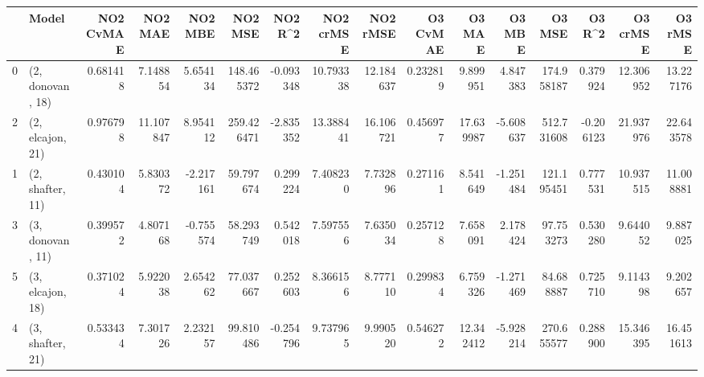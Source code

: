 \begin{tabular}{llrrrrrrrrrrrrrr}
\toprule
{} &             Model &  NO2 CvMAE &    NO2 MAE &   NO2 MBE &     NO2 MSE &   NO2 R\textasciicircum2 &  NO2 crMSE &   NO2 rMSE &  O3 CvMAE &     O3 MAE &    O3 MBE &      O3 MSE &    O3 R\textasciicircum2 &   O3 crMSE &    O3 rMSE \\
\midrule
0 &  (2, donovan, 18) &   0.681418 &   7.148854 &  5.654134 &  148.465372 & -0.093348 &  10.793338 &  12.184637 &  0.232819 &   9.899951 &  4.847383 &  174.958187 &  0.379924 &  12.306952 &  13.227176 \\
2 &  (2, elcajon, 21) &   0.976798 &  11.107847 &  8.954112 &  259.426471 & -2.835352 &  13.388441 &  16.106721 &  0.456977 &  17.639987 & -5.608637 &  512.731608 & -0.206123 &  21.937976 &  22.643578 \\
1 &  (2, shafter, 11) &   0.430104 &   5.830372 & -2.217161 &   59.797674 &  0.299224 &   7.408230 &   7.732896 &  0.271161 &   8.541649 & -1.251484 &  121.195451 &  0.777531 &  10.937515 &  11.008881 \\
3 &  (3, donovan, 11) &   0.399572 &   4.807168 & -0.755574 &   58.293749 &  0.542018 &   7.597556 &   7.635034 &  0.257128 &   7.658091 &  2.178424 &   97.753273 &  0.530280 &   9.644052 &   9.887025 \\
5 &  (3, elcajon, 18) &   0.371024 &   5.922038 &  2.654262 &   77.037667 &  0.252603 &   8.366156 &   8.777110 &  0.299834 &   6.759326 & -1.271469 &   84.688887 &  0.725710 &   9.114398 &   9.202657 \\
4 &  (3, shafter, 21) &   0.533434 &   7.301726 &  2.232157 &   99.810486 & -0.254796 &   9.737965 &   9.990520 &  0.546272 &  12.342412 & -5.928214 &  270.655577 &  0.288900 &  15.346395 &  16.451613 \\
\bottomrule
\end{tabular}
